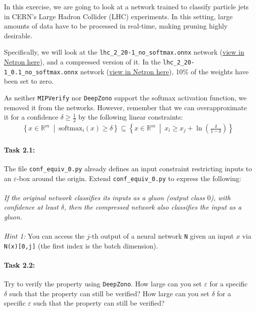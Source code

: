 \documentclass[11pt,fleqn]{article}
\begin{document}
In this exercise, we are going to look at a network trained to classify particle jets in CERN's 
Large Hadron Collider (LHC) experiments.
In this setting, large amounts of data have to be processed in real-time, making pruning highly desirable.

Specifically, we will look at the \texttt{lhc\_2\_20-1\_no\_softmax.onnx} network (\href{https://netron.app/?url=https://github.com/samysweb/nn-verification-101/blob/f1260815790301da1127bd085e3797108e0eeec4/provided/nets/lhc_2_20-1_no_softmax.onnx}{view in Netron here}), and a compressed version of it.
In the \texttt{lhc\_2\_20-1\_0.1\_no\_softmax.onnx} network (\href{https://netron.app/?url=https://github.com/samysweb/nn-verification-101/blob/f1260815790301da1127bd085e3797108e0eeec4/provided/nets/lhc_2_20-1-0.1_no_softmax.onnx}{view in Netron here}), 10\% of the weights have been set to zero.

As neither \texttt{MIPVerify} nor \texttt{DeepZono} support the softmax activation function, we removed it from the networks.
However, remember that we can overapproximate it for a confidence $\delta \geq \frac{1}{2}$ by the following linear constraints: 
\begin{align*}
    \left\{
        x \in \mathbb{R}^m~\middle|~
        \mathrm{softmax}_i\left(x\right) \geq \delta
    \right\}
\subseteq
\left\{
x \in \mathbb{R}^m~\middle|~
x_i \geq x_j + \ln\left(\frac{\delta}{1-\delta}\right)
\right\}
\end{align*}

\paragraph{Task 2.1:}
The file \texttt{conf\_equiv\_0.py} already defines an input constraint restricting inputs to an $\varepsilon$-box around the origin.
Extend \texttt{conf\_equiv\_0.py} to express the following:
\\
\\
\emph{If the original network classifies its inputs as a gluon (output class $0$), with confidence at least $\delta$, 
then the compressed network also classifies the input as a gluon.}
\\
\\
\textit{Hint 1:} 
You can access the $j$-th output of a neural network \texttt{N} given an input $x$ via \texttt{N(x)[0,j]} (the first index is the batch dimension).

\paragraph{Task 2.2:}
Try to verify the property using \texttt{DeepZono}.
How large can you set $\varepsilon$ for a specific $\delta$ such that the property can still be verified?
How large can you set $\delta$ for a specific $\varepsilon$ such that the property can still be verified?
\end{document}
